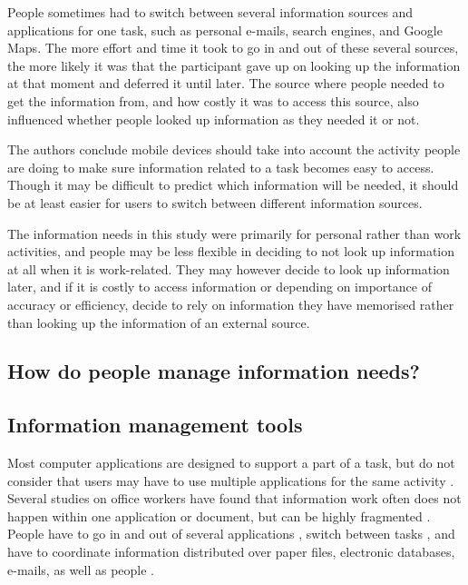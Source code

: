 People sometimes had to switch between several information sources and applications for one task, such as personal e-mails, search engines, and Google Maps. The more effort and time it took to go in and out of these several sources, the more likely it was that the participant gave up on looking up the information at that moment and deferred it until later. The source where people needed to get the information from, and how costly it was to access this source, also influenced whether people looked up information as they needed it or not.

The authors conclude mobile devices should take into account the activity people are doing to make sure information related to a task becomes easy to access. Though it may be difficult to predict which information will be needed, it should be at least easier for users to switch between different information sources.

The information needs in this study were primarily for personal rather than work activities, and people may be less flexible in deciding to not look up information at all when it is work-related. They may however decide to look up information later, and if it is costly to access information or depending on importance of accuracy or efficiency, decide to rely on information they have memorised rather than looking up the information of an external source. 

\subsection{How do people manage information needs?}

\subsection{Information management tools}
Most computer applications are designed to support a part of a task, but do not consider that users may have to use multiple applications for the same activity \citep{Cangiano2009}. Several studies on office workers have found that information work often does not happen within one application or document, but can be highly fragmented \citep{Cangiano2009, Czerwinski2004, Mark2005, Sellberg2014}. People have to go in and out of several applications \citep{Cangiano2009, Iqbal2007}, switch between tasks \citep{Czerwinski2004, Mark2005}, and have to coordinate information distributed over paper files, electronic databases, e-mails, as well as people \citep{Sellberg2014}. 


